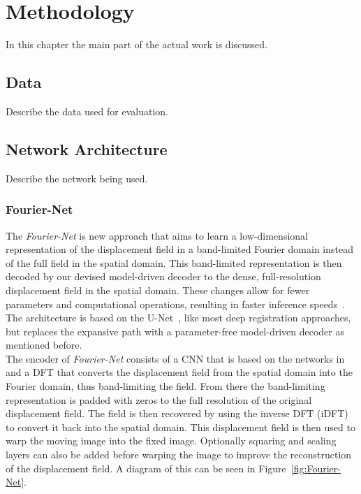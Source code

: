 \documentclass[english,version-2022-01]{uzl-thesis} %
\begin{document}

\chapter{Methodology}
In this chapter the main part of the actual work is discussed.

\section{Data}
Describe the data used for evaluation.

\section{Network Architecture}
Describe the network being used.

\subsection{Fourier-Net}
The \emph{Fourier-Net}  is new approach that aims to learn a low-dimensional representation of the displacement field in a band-limited Fourier domain instead of the full field in the spatial domain. This band-limited representation is then decoded by our devised model-driven decoder to the dense, full-resolution displacement field in the spatial domain. These changes allow for fewer parameters and computational operations, resulting in faster inference speeds~\cite{Fourier-Net}. The architecture is based on the U-Net~\cite{U-Net}, like most deep registration approaches, but replaces the expansive path with a parameter-free model-driven decoder as mentioned before.\\
The encoder of \emph{Fourier-Net} consists of a CNN that is based on the networks in~\cite{Zhang2018,Mok2020} and a DFT that converts the displacement field from the spatial domain into the Fourier domain, thus band-limiting the field. From there the band-limiting representation is padded with zeros to the full resolution of the original displacement field. The field is then recovered by using the inverse DFT (iDFT) to convert it back into the spatial domain. This displacement field is then used to warp the moving image into the fixed image. Optionally squaring and scaling layers can also be added before warping the image to improve the reconstruction of the displacement field. A diagram of this can be seen in Figure~\ref{fig:Fourier-Net}.
\end{document}
